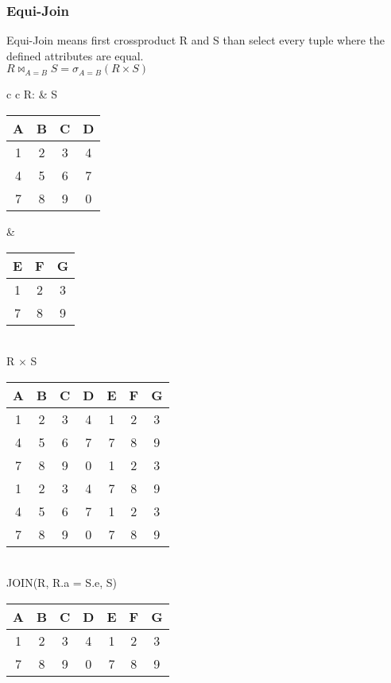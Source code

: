 \subsubsection{Equi-Join}
Equi-Join means first crossproduct R and S than select every tuple where the
defined attributes are equal.\\
$R \bowtie_{A = B} S = \sigma_{A = B} (R \times S) $

\begin{tabular}{ c c}
	R: & S \\
	\begin{tabular}{|c|c|c|c|}
		\hline
		A & B & C & D\\
		\hline
		1 & 2 & 3 & 4\\
		\hline
		4 & 5 & 6 & 7\\
		\hline
		7 & 8 & 9 & 0\\
		\hline
	\end{tabular} &

	\begin{tabular}{|c|c|c|}
		\hline
		E & F & G \\
		\hline
		1 & 2 & 3\\
		\hline
		7 & 8 & 9\\
		\hline
	\end{tabular}
\end{tabular}\\

R $\times$ S \\
\begin{tabular}{|c|c|c|c|c|c|c|}
	\hline
	A & B & C & D & E & F & G\\
	\hline
	1 & 2 & 3 & 4 & 1 & 2 & 3\\
	\hline
	4 & 5 & 6 & 7 & 7 & 8 & 9\\
	\hline
	7 & 8 & 9 & 0 & 1 & 2 & 3\\
	\hline                     
	1 & 2 & 3 & 4 & 7 & 8 & 9\\
	\hline
	4 & 5 & 6 & 7 & 1 & 2 & 3\\
	\hline                     
	7 & 8 & 9 & 0 & 7 & 8 & 9\\
	\hline
\end{tabular}\\

JOIN(R, R.a = S.e, S)\\
\begin{tabular}{|c|c|c|c|c|c|c|}
	\hline
	A & B & C & D & E & F & G\\
	\hline
	1 & 2 & 3 & 4 & 1 & 2 & 3\\
	\hline
	7 & 8 & 9 & 0 & 7 & 8 & 9\\
	\hline
\end{tabular}\\

